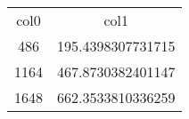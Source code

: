 \begin{table}
\begin{tabular}{cc}
col0 & col1 \\
486 & 195.4398307731715 \\
1164 & 467.8730382401147 \\
1648 & 662.3533810336259 \\
\end{tabular}
\end{table}
